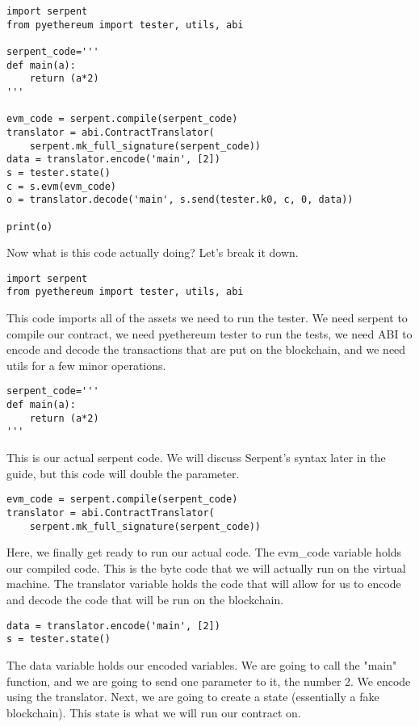 \documentclass[12pt]{article}
\begin{document}
\begin{lstlisting}[frame=single]
import serpent
from pyethereum import tester, utils, abi

serpent_code='''
def main(a):
	return (a*2)
'''

evm_code = serpent.compile(serpent_code)
translator = abi.ContractTranslator(
	serpent.mk_full_signature(serpent_code))
data = translator.encode('main', [2])
s = tester.state()
c = s.evm(evm_code)
o = translator.decode('main', s.send(tester.k0, c, 0, data))

print(o)
\end{lstlisting}

Now what is this code actually doing? Let's break it down.

\begin{lstlisting}
import serpent
from pyethereum import tester, utils, abi
\end{lstlisting}

This code imports all of the assets we need to run the tester. We need serpent to compile our contract, we need pyethereum tester to run the tests, we need ABI to encode and decode the transactions that are put on the blockchain, and we need utils for a few minor operations.

\begin{lstlisting}
serpent_code='''
def main(a):
	return (a*2)
'''
\end{lstlisting}

This is our actual serpent code. We will discuss Serpent's syntax later in the guide, but this code will double the parameter.

\begin{lstlisting}
evm_code = serpent.compile(serpent_code)
translator = abi.ContractTranslator(
	serpent.mk_full_signature(serpent_code))
\end{lstlisting}

Here, we finally get ready to run our actual code. The evm\_code variable holds our compiled code. This is the byte code that we will actually run on the virtual machine. The translator variable holds the code that will allow for us to encode and decode the code that will be run on the blockchain.

\begin{lstlisting}
data = translator.encode('main', [2])
s = tester.state()
\end{lstlisting}

The data variable holds our encoded variables. We are going to call the "main" function, and we are going to send one parameter to it, the number 2. We encode using the translator. Next, we are going to create a state (essentially a fake blockchain). This state is what we will run our contract on. 
\end{document}
